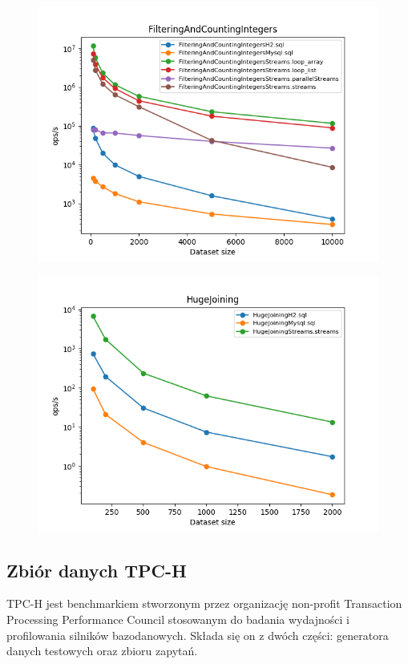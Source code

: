 \documentclass[12pt]{extarticle}
\begin{document}
\begin{figure}[H]
\centering
\includegraphics[width=13cm]{plots/FilteringAndCountingIntegers}
\end{figure}

\begin{figure}[H]
\centering
\includegraphics[width=13cm]{plots/HugeJoining}
\end{figure}




\subsection{Zbiór danych TPC-H} \label{tpc}

    TPC-H jest benchmarkiem stworzonym przez organizację non-profit Transaction Processing Performance Council stosowanym do badania wydajności i profilowania silników bazodanowych. Składa się on z dwóch części: generatora danych testowych oraz zbioru zapytań.
\end{document}
